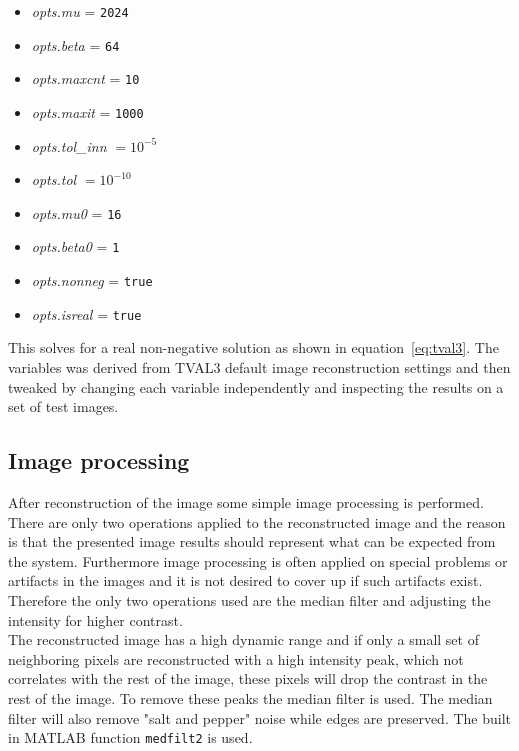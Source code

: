 \begin{itemize}
\item \textit{opts.mu} = \texttt{2024}
\item \textit{opts.beta} = \texttt{64}
\item \textit{opts.maxcnt} = \texttt{10}
\item \textit{opts.maxit} = \texttt{1000}
\item \textit{opts.tol\_inn} $= 10^{-5}$
\item \textit{opts.tol} $= 10^{-10}$ 
\item \textit{opts.mu0} = \texttt{16} 
\item \textit{opts.beta0} = \texttt{1}
\item \textit{opts.nonneg} = \texttt{true}
\item \textit{opts.isreal} = \texttt{true}	
\end{itemize} 

This solves for a real non-negative solution as shown in equation~\ref{eq:tval3}. The variables was derived from TVAL3 default image reconstruction settings and then tweaked by changing each variable independently and inspecting the results on a set of test images.


\subsection{Image processing}
\label{sec:ip}
After reconstruction of the image some simple image processing is performed. There are only two operations applied to the reconstructed image and the reason is that the presented image results should represent what can be expected from the system. Furthermore image processing is often applied on special problems or artifacts in the images and it is not desired to cover up if such artifacts exist. Therefore the only two operations used are the median filter and adjusting the intensity for higher contrast.\\[0.1in]

The reconstructed image has a high dynamic range and if only a small set of neighboring pixels are reconstructed with a high intensity peak, which not correlates with the rest of the image, these pixels will drop the contrast in the rest of the image. To remove these peaks the median filter is used. The median filter will also remove "salt and pepper" noise while edges are preserved. The built in MATLAB function \texttt{medfilt2} is used.\\[0.1in]

